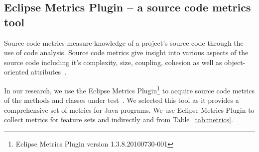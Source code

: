\documentclass[conference]{IEEEtran}
\begin{document}
\subsection{Eclipse Metrics Plugin -- a source code metrics tool}
\label{subsec:Metrics}
Source code metrics measure knowledge of a project's source code through the use of code analysis. Source code metrics give insight into various aspects of the source code including it's complexity, size, coupling, cohesion as well as object-oriented attributes~\cite{SCE05,McCa76,Kan02,HWY09,Hend95,SRD12}.

In our research, we use the Eclipse Metrics Plugin\footnote{Eclipse Metrics Plugin version 1.3.8.20100730-001} to acquire source code metrics of the methods and classes under test~\cite{Metrics}. We selected this tool as it provides a comprehensive set of metrics for Java programs. 
We use Eclipse Metrics Plugin to collect metrics for feature sets  and indirectly  and  from Table~\ref{tab:metrics}.
\end{document}
